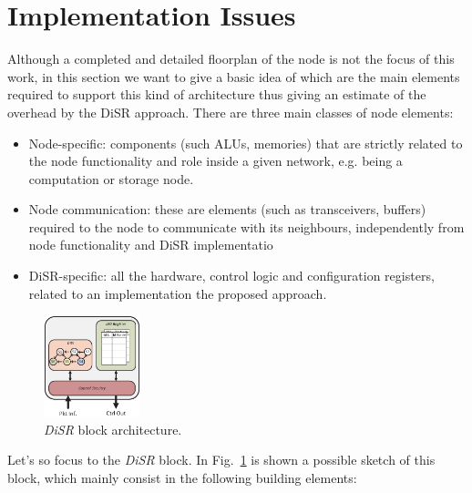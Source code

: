 
\section{Implementation Issues}
\label{sec:implementation}

Although a completed and detailed floorplan of the node is not the
focus of this work, in this section we want to give a basic idea of
which are the main elements required to support this kind of
architecture thus giving an estimate of the overhead by the
DiSR approach. There are three main classes of node elements:
\begin{itemize}
\item Node-specific: components (such ALUs, memories) that are
strictly related to the node functionality and role inside a given
network, e.g. being a computation or storage node.
\item Node communication:  these are elements (such as transceivers,
buffers) required to the node to communicate with its neighbours,
independently from node functionality and DiSR implementatio
\item DiSR-specific: all the hardware, control logic and
configuration registers, related to an implementation the proposed approach.
\end{itemize}

\begin{figure}
  \centering
  \includegraphics[width=0.25\textwidth]{pictures/disr_imp.eps}
  \caption{\emph{DiSR} block architecture.}
 \label{fig:implementation}
\end{figure}

Let's so focus to the \emph{DiSR} block. In
Fig.~\ref{fig:implementation} is shown a possible sketch of this
block, which mainly consist in the following building elements:

